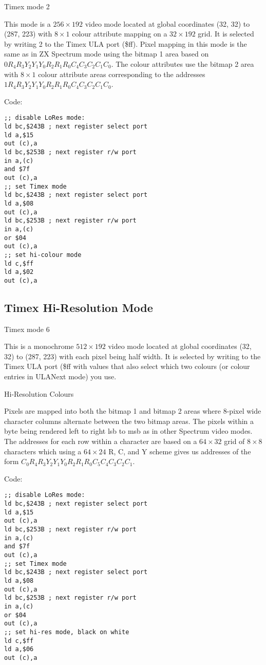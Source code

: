 Timex mode 2

This mode is a $256\times192$ video mode located at global coordinates
(32, 32) to (287, 223) with $8\times1$ colour attribute mapping on a
$32\times192$ grid. It is selected by writing 2 to the Timex ULA port
(\$ff).  Pixel mapping in this mode is the same as in ZX Spectrum mode
using the bitmap 1 area based on
$0R_4R_3Y_2Y_1Y_0R_2R_1R_0C_4C_3C_2C_1C_0$.  The colour attributes use
the bitmap 2 area with $8\times1$ colour attribute areas corresponding
to the addresses $1R_4R_3Y_2Y_1Y_0R_2R_1R_0C_4C_3C_2C_1C_0$.

\sinset
Code:
\begin{verbatim}
;; disable LoRes mode:
ld bc,$243B ; next register select port
ld a,$15
out (c),a
ld bc,$253B ; next register r/w port
in a,(c)
and $7f
out (c),a
;; set Timex mode
ld bc,$243B ; next register select port
ld a,$08
out (c),a
ld bc,$253B ; next register r/w port
in a,(c)
or $04
out (c),a
;; set hi-colour mode
ld c,$ff
ld a,$02
out (c),a
\end{verbatim}
\einset

\subsection{Timex Hi-Resolution Mode}

Timex mode 6

This is a monochrome $512\times192$ video mode located at global
coordinates (32, 32) to (287, 223) with each pixel being half
width. It is selected by writing to the Timex ULA port (\$ff with
values that also select which two colours (or colour entries in
ULANext mode) you use.

\sinset
\begin{table}[h]\centering
  \caption{Hi-Resolution Colours}
\end{table}
\einset

Pixels are mapped into both the bitmap 1 and bitmap 2 areas where
8-pixel wide character columns alternate between the two bitmap areas.
The pixels within a byte being rendered left to right lsb to msb as in
other Spectrum video modes.  The addresses for each row within a
character are based on a $64\times32$ grid of $8\times8$ characters
which using a $64\times24$ R, C, and Y scheme gives us addresses of
the form $C_0R_4R_3Y_2Y_1Y_0R_2R_1R_0C_5C_4C_3C_2C_1$.

\sinset
Code:
\begin{verbatim}
;; disable LoRes mode:
ld bc,$243B ; next register select port
ld a,$15
out (c),a
ld bc,$253B ; next register r/w port
in a,(c)
and $7f
out (c),a
;; set Timex mode
ld bc,$243B ; next register select port
ld a,$08
out (c),a
ld bc,$253B ; next register r/w port
in a,(c)
or $04
out (c),a
;; set hi-res mode, black on white
ld c,$ff
ld a,$06
out (c),a
\end{verbatim}
\einset

